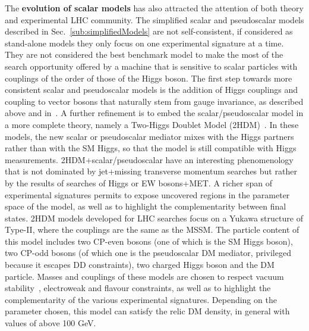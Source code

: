 The \textbf{evolution of scalar models} has also attracted the attention of both theory and experimental LHC community. The simplified scalar and pseudoscalar models described in Sec.~\ref{sub:simplifiedModels} are not self-consistent, if considered as stand-alone models they only focus on one experimental signature at a time. They are not considered the best benchmark model to make the most of %
the search opportunity offered by a machine that is sensitive to scalar particles with couplings of the order of those of the Higgs boson.
The first step towards more consistent scalar and pseudoscalar models is the addition of Higgs couplings and coupling to vector bosons that naturally stem from gauge invariance, as described above and in~\cite{Bauer:2016gys,Berlin:2014cfa}. A further refinement is to embed the scalar/pseudoscalar model in a more complete theory, namely a Two-Higgs Doublet Model (2HDM)~\cite{Bauer:2017ota,Ipek:2014gua,No:2015xqa,Goncalves:2016iyg,Bell:2016ekl}. 
In these models, the new scalar or pseudoscalar mediator mixes with the Higgs partners rather than with the SM Higgs, so that the model is still compatible with Higgs measurements. 2HDM+scalar/pseudoscalar have an interesting phenomenology that is not dominated by jet+missing transverse momentum searches but rather by the results of searches of Higgs or EW bosons+MET. A richer span of experimental signatures permits to expose uncovered regions in the parameter space of the model, as well as to highlight the complementarity between final states. 2HDM models developed for LHC searches focus on a Yukawa structure of Type-II, where the couplings are the same as the MSSM. The particle content of this model includes two CP-even bosons (one of which is the SM Higgs boson), two CP-odd bosons (of which one is the pseudoscalar DM mediator, privileged because it escapes DD constraints), two charged Higgs boson and the DM particle. Masses and couplings of these models are chosen to respect vacuum stability~\cite{No:2015xqa}, electroweak and flavour constraints, as well as to highlight the complementarity of the various experimental signatures. Depending on the parameter chosen, this model can satisfy the relic DM density, in general with values of \mdm above 100 GeV.   

